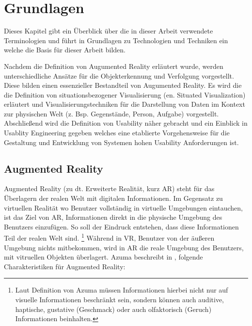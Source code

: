 \chapter{Grundlagen}

Dieses Kapitel gibt ein Überblick über die in dieser Arbeit verwendete Terminologien und führt in Grundlagen zu Technologien und Techniken ein welche die Basis für dieser Arbeit bilden. 

Nachdem die Definition von Augumented Reality erläutert wurde, werden unterschiedliche Ansätze für die Objekterkennung und Verfolgung vorgestellt.  Diese bilden einen essenzieller Bestandteil von Augumented Reality.  
Es wird die die Definition von situationsbezogener Visualisierung (en. Situated Visualization) erläutert und Visualisierungstechniken für die Darstellung von Daten im Kontext zur physischen Welt (z. Bsp. Gegenstände, Person,  Aufgabe) vorgestellt. 
Abschließend wird die Definition von Usability näher gebracht und  ein Einblick in Usablity Engineering gegeben welches  eine etablierte Vorgehensweise für die Gestaltung und  Entwicklung von Systemen hohen Usability Anforderungen ist. 


\section{Augmented Reality}

Augmented Reality (zu dt. Erweiterte Realität, kurz AR) steht für das Überlagern der realen Welt mit digitalen Informationen. \cite{Azuma.1997,DieterSchmalstieg2016} Im Gegensatz zu virtuellen Realität wo Benutzer vollständig in virtuelle Umgebungen eintauchen,
ist das Ziel von AR, Informationen direkt in die physische Umgebung des Benutzers einzufügen. So soll der Eindruck entstehen, dass diese Informationen Teil der realen Welt sind. \footnote[1]{ Laut Definition von Azuma  müssen Informationen hierbei nicht nur auf visuelle Informationen beschränkt sein, 
sondern können auch auditive, haptische, gustative (Geschmack) oder auch olfaktorisch (Geruch) Informationen beinhalten.} \cite{Azuma.1997} Während in VR, Benutzer von der äußeren Umgebung nichts mitbekommen, wird in AR die reale Umgebung des Benutzers, mit vitruellen 
Objekten überlagert. Azuma beschreibt in \cite{Azuma.1997}, folgende Charakteristiken für Augmented Reality: 

